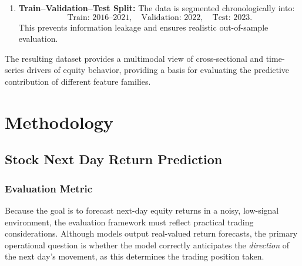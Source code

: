 \documentclass[11pt]{article}
\begin{document}
\begin{enumerate}


    \item \textbf{Train--Validation--Test Split:}  
    The data is segmented chronologically into:
    \[
    \text{Train: 2016--2021},\quad
    \text{Validation: 2022},\quad
    \text{Test: 2023}.
    \]
    This prevents information leakage and ensures realistic out-of-sample evaluation.

\end{enumerate}

\noindent The resulting dataset provides a multimodal view of cross-sectional and time-series drivers of equity behavior, providing a basis for evaluating the predictive contribution of different feature families.

\section{Methodology}
\subsection{Stock Next Day Return Prediction}
\subsubsection*{Evaluation Metric}
Because the goal is to forecast next-day equity returns in a noisy, low-signal environment, the evaluation framework must reflect practical trading considerations. Although models output real-valued return forecasts, the primary operational question is whether the model correctly anticipates the \emph{direction} of the next day's movement, as this determines the trading position taken.
\end{document}
